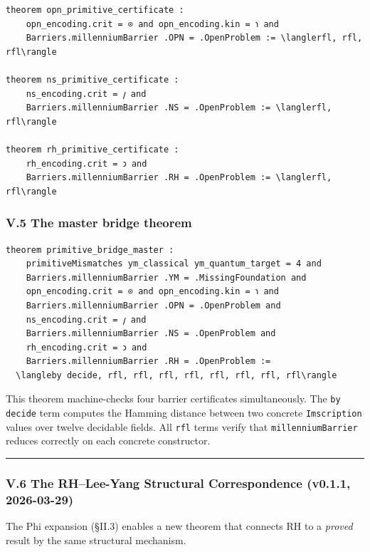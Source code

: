 \documentclass[12pt,a4paper]{article}
\newcommand{\pilcrow}{\S}
\begin{document}
\begin{lstlisting}[language=lean]
theorem opn_primitive_certificate :
    opn_encoding.crit = ⊙ and opn_encoding.kin = 𐑪 and
    Barriers.millenniumBarrier .OPN = .OpenProblem := \langlerfl, rfl, rfl\rangle

theorem ns_primitive_certificate :
    ns_encoding.crit = 𐑢 and
    Barriers.millenniumBarrier .NS = .OpenProblem := \langlerfl, rfl\rangle

theorem rh_primitive_certificate :
    rh_encoding.crit = 𐑮 and
    Barriers.millenniumBarrier .RH = .OpenProblem := \langlerfl, rfl\rangle
\end{lstlisting}

\subsubsection{V.5 The master bridge theorem}

\begin{lstlisting}[language=lean]
theorem primitive_bridge_master :
    primitiveMismatches ym_classical ym_quantum_target = 4 and
    Barriers.millenniumBarrier .YM = .MissingFoundation and
    opn_encoding.crit = ⊙ and opn_encoding.kin = 𐑪 and
    Barriers.millenniumBarrier .OPN = .OpenProblem and
    ns_encoding.crit = 𐑢 and
    Barriers.millenniumBarrier .NS = .OpenProblem and
    rh_encoding.crit = 𐑮 and
    Barriers.millenniumBarrier .RH = .OpenProblem :=
  \langleby decide, rfl, rfl, rfl, rfl, rfl, rfl, rfl, rfl\rangle
\end{lstlisting}

This theorem machine-checks four barrier certificates simultaneously. The \texttt{by decide} term computes the Hamming distance between two concrete \texttt{Imscription} values over twelve decidable fields. All \texttt{rfl} terms verify that \texttt{millenniumBarrier} reduces correctly on each concrete constructor.

\begin{center}
\rule{0.5\textwidth}{0.4pt}
\end{center}

\subsubsection{V.6 The RH--Lee-Yang Structural Correspondence (v0.1.1, 2026-03-29)}

The Phi expansion (\pilcrow{}II.3) enables a new theorem that connects RH to a \emph{proved} result by the same structural mechanism.
\end{document}
